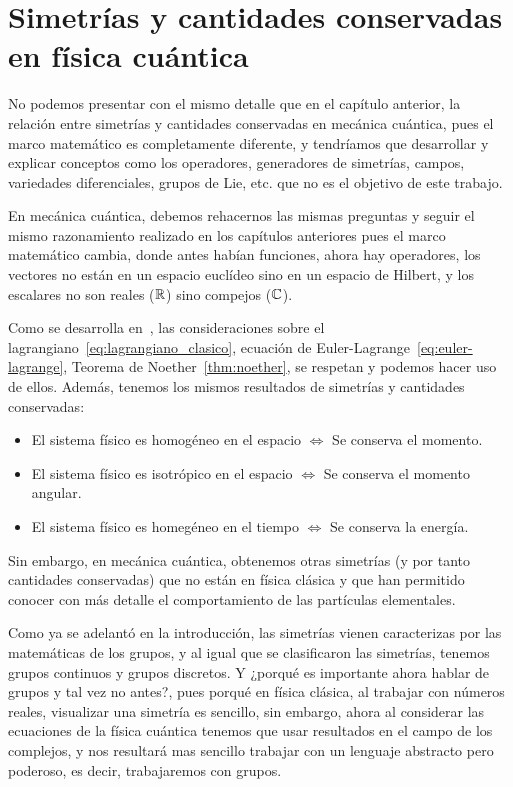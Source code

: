 
\section{Simetrías y cantidades conservadas en física cuántica}\label{ch:simetrias-y-cantidades-conservadas-en-fisica-cuantica}

No podemos presentar con el mismo detalle que en el capítulo anterior, la relación entre simetrías y cantidades conservadas en mecánica cuántica, pues el marco matemático es completamente diferente, y tendríamos que desarrollar y explicar conceptos como los operadores, generadores de simetrías, campos, variedades diferenciales, grupos de Lie, etc. que no es el objetivo de este trabajo.

En mecánica cuántica, debemos rehacernos las mismas preguntas y seguir el mismo razonamiento realizado en los capítulos anteriores pues el marco matemático cambia, donde antes habían funciones, ahora hay operadores, los vectores no están en un espacio euclídeo sino en un espacio de Hilbert, y los escalares no son reales ($\mathbb{R}$) sino compejos ($\mathbb{C}$).

Como se desarrolla en~\cite{QMS}, las consideraciones sobre el lagrangiano~\eqref{eq:lagrangiano_clasico}, ecuación de Euler-Lagrange~\eqref{eq:euler-lagrange}, Teorema de Noether~\eqref{thm:noether}, se respetan y podemos hacer uso de ellos.
Además, tenemos los mismos resultados de simetrías y cantidades conservadas:

\begin{itemize}
	\item El sistema físico es homogéneo en el espacio $\Leftrightarrow$ Se conserva el momento.
	\item El sistema físico es isotrópico en el espacio $\Leftrightarrow$ Se conserva el momento angular.
	\item El sistema físico es homegéneo en el tiempo $\Leftrightarrow$ Se conserva la energía.
\end{itemize}

Sin embargo, en mecánica cuántica, obtenemos otras simetrías (y por tanto cantidades conservadas) que no están en física clásica y que han permitido conocer con más detalle el comportamiento de las partículas elementales.

Como ya se adelantó en la introducción, las simetrías vienen caracterizas por las matemáticas de los grupos, y al igual que se clasificaron las simetrías, tenemos grupos continuos y grupos discretos.
Y ¿porqué es importante ahora hablar de grupos y tal vez no antes?, pues porqué en física clásica, al trabajar con números reales, visualizar una simetría es sencillo, sin embargo, ahora al considerar las ecuaciones de la física cuántica tenemos que usar resultados en el campo de los complejos, y nos resultará mas sencillo trabajar con un lenguaje abstracto pero poderoso, es decir, trabajaremos con grupos.


